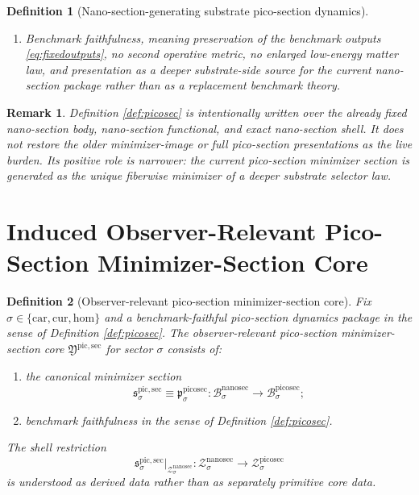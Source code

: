\documentclass[11pt]{article}
\newcommand{\Car}{\mathrm{car}}
\newcommand{\Cur}{\mathrm{cur}}
\newcommand{\Hom}{\mathrm{hom}}
\newcommand{\NanoSectionBody}[1]{\mathcal B_{#1}^{\mathrm{nanosec}}}
\newcommand{\NanoSectionShell}[1]{\mathcal Z_{#1}^{\mathrm{nanosec}}}
\newcommand{\PicoSectionBody}[1]{\mathcal B_{#1}^{\mathrm{picosec}}}
\newcommand{\PicoSectionProj}[1]{\Pi_{#1}^{\mathrm{picosec}}}
\newcommand{\PicoSectionFiber}[2]{\mathcal F_{#1}^{\mathrm{picosec}}(#2)}
\newcommand{\PicoSectionNanoMin}[1]{\mathfrak p_{#1}^{\mathrm{picosec}}}
\newcommand{\PicoSectionFunctional}[1]{\mathscr P_{#1}^{\mathrm{picosec}}}
\newcommand{\PicoSectionShell}[1]{\mathcal Z_{#1}^{\mathrm{picosec}}}
\newcommand{\PicoMinSectionCore}{\mathfrak Y^{\mathrm{pic,sec}}}
\newcommand{\PicoMinSection}[1]{\mathfrak s_{#1}^{\mathrm{pic,sec}}}
\newtheorem{definition}{Definition}
\newtheorem{remark}{Remark}
\begin{document}
\begin{definition}[Nano-section-generating substrate pico-section dynamics]
\begin{enumerate}
\[\begin{array}{l}
    \PicoSectionFunctional{\sigma}(r)
    =
    \displaystyle\min_{s\in\PicoSectionFiber{\sigma}{\PicoSectionProj{\sigma}(r)}}
    \PicoSectionFunctional{\sigma}(s)
    \end{array}
    \right\},
    \]
    and
    \[
    \PicoSectionProj{\sigma}\big|_{\PicoSectionShell{\sigma}}
    :
    \PicoSectionShell{\sigma}
    \xrightarrow{\cong}
    \NanoSectionShell{\sigma}
    \]
    is a diffeomorphism.
    \item Benchmark faithfulness, meaning preservation of the benchmark outputs \eqref{eq:fixedoutputs}, no second operative metric, no enlarged low-energy matter law, and presentation as a deeper substrate-side source for the current nano-section package rather than as a replacement benchmark theory.
\end{enumerate}
\end{definition}

\begin{remark}
Definition \ref{def:picosec} is intentionally written over the already fixed nano-section body, nano-section functional, and exact nano-section shell. It does not restore the older minimizer-image or full pico-section presentations as the live burden. Its positive role is narrower: the current pico-section minimizer section is generated as the unique fiberwise minimizer of a deeper substrate selector law.
\end{remark}

\section{Induced Observer-Relevant Pico-Section Minimizer-Section Core}

\begin{definition}[Observer-relevant pico-section minimizer-section core]
\label{def:sectioncore}
Fix \(\sigma\in\{\Car,\Cur,\Hom\}\) and a benchmark-faithful pico-section dynamics package in the sense of Definition \ref{def:picosec}. The \emph{observer-relevant pico-section minimizer-section core} \(\PicoMinSectionCore\) for sector \(\sigma\) consists of:
\begin{enumerate}
    \item the canonical minimizer section
    \[
    \PicoMinSection{\sigma}
    \equiv
    \PicoSectionNanoMin{\sigma}
    :
    \NanoSectionBody{\sigma}\to\PicoSectionBody{\sigma};
    \]
    \item benchmark faithfulness in the sense of Definition \ref{def:picosec}.
\end{enumerate}
The shell restriction
\[
\PicoMinSection{\sigma}\big|_{\NanoSectionShell{\sigma}}
:
\NanoSectionShell{\sigma}\to\PicoSectionShell{\sigma}
\]
is understood as derived data rather than as separately primitive core data.
\end{definition}
\end{document}
